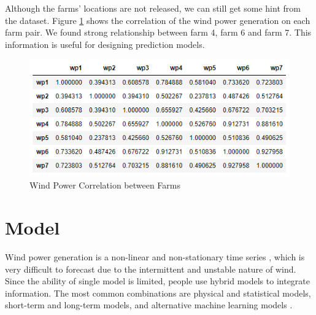 \documentclass[conference]{IEEEtran}
\begin{document}
Although the farms’ locations are not released, we can still get some hint from the dataset. Figure \ref{fig:farm} shows the correlation of the wind power generation on each farm pair. We found strong relationship between farm 4, farm 6 and farm 7. This information is useful for designing prediction models. \begin{figure}
\centering
\includegraphics[width=0.9\columnwidth]{FIG/farm}
\caption{Wind Power Correlation between Farms}
\label{fig:farm}
\end{figure}



\section{Model}
Wind power generation is a non-linear and non-stationary time series \cite{WANG2017977}, which is very difficult to forecast due to the intermittent and unstable nature of wind. Since the ability of single model is limited, people use hybrid models to integrate information. The most common combinations are physical and statistical models, short-term and long-term models, and alternative machine learning models \cite{Chang14}. 
\end{document}
